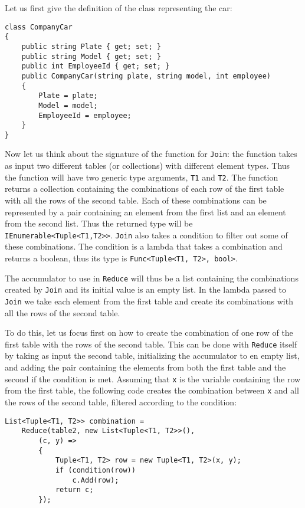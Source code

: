 Let us first give the definition of the class representing the car:

\begin{lstlisting}
class CompanyCar
{
	public string Plate { get; set; }
	public string Model { get; set; }
	public int EmployeeId { get; set; }
	public CompanyCar(string plate, string model, int employee)
	{
		Plate = plate;
		Model = model;
		EmployeeId = employee;
	}
}
\end{lstlisting}

\noindent
Now let us think about the signature of the function for \texttt{Join}: the function takes as input two different tables (or collections) with different element types. Thus the function will have two generic type arguments, \texttt{T1} and \texttt{T2}. The function returns a collection containing the combinations of each row of the first table with all the rows of the second table. Each of these combinations can be represented by a pair containing an element from the first list and an element from the second list. Thus the returned type will be \texttt{IEnumerable<Tuple<T1,T2>>}. \texttt{Join} also takes a condition to filter out some of these combinations. The condition is a lambda that takes a combination and returns a boolean, thus its type is \texttt{Func<Tuple<T1, T2>, bool>}.

The accumulator to use in \texttt{Reduce} will thus be a list containing the combinations created by \texttt{Join} and its initial value is an empty list. In the lambda passed to \texttt{Join} we take each element from the first table and create its combinations with all the rows of the second table.

To do this, let us focus first on how to create the combination of one row of the first table with the rows of the second table. This can be done with \texttt{Reduce} itself by taking as input the second table, initializing the accumulator to en empty list, and adding the pair containing the elements from both the first table and the second if the condition is met. Assuming that \texttt{x} is the variable containing the row from the first table, the following code creates the combination between \texttt{x} and all the rows of the second table, filtered according to the condition:

\begin{lstlisting}
List<Tuple<T1, T2>> combination =
	Reduce(table2, new List<Tuple<T1, T2>>(),
		(c, y) =>
		{
			Tuple<T1, T2> row = new Tuple<T1, T2>(x, y);
			if (condition(row))
				c.Add(row);
			return c;
		});
\end{lstlisting}

